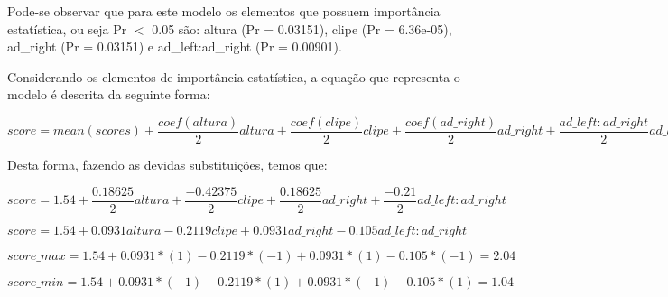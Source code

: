 Pode-se observar que para este modelo os elementos que possuem importância estatística, ou seja Pr $<$ 0.05 são: altura (Pr = 0.03151), clipe (Pr = 6.36e-05), ad\_right (Pr = 0.03151) e ad\_left:ad\_right (Pr = 0.00901). 

Considerando os elementos de importância estatística, a equação que representa o modelo é descrita da seguinte forma:

\begin{center}
$
  score = mean(scores) + \dfrac{coef(altura)}{2}altura + \dfrac{coef(clipe)}{2}clipe + \dfrac{coef(ad\_right)}{2}ad\_right +  \dfrac{ad\_left:ad\_right}{2}ad\_left:ad\_right
$  
\end{center}

Desta forma, fazendo as devidas substituições, temos que:

\begin{center}
  $
    score = 1.54 + \dfrac{0.18625}{2}altura + \dfrac{-0.42375}{2}clipe + \dfrac{0.18625}{2}ad\_right +  \dfrac{-0.21}{2}ad\_left:ad\_right
  $  

  $ score = 1.54 + 0.0931altura- 0.2119clipe + 0.0931ad\_right - 0.105ad\_left:ad\_right$

  $score\_max =  1.54 + 0.0931*(1)- 0.2119*(-1) + 0.0931*(1) - 0.105*(-1) = 2.04$

  $score\_min =  1.54 + 0.0931*(-1)- 0.2119*(1) + 0.0931*(-1) - 0.105*(1) = 1.04$
  \end{center}
